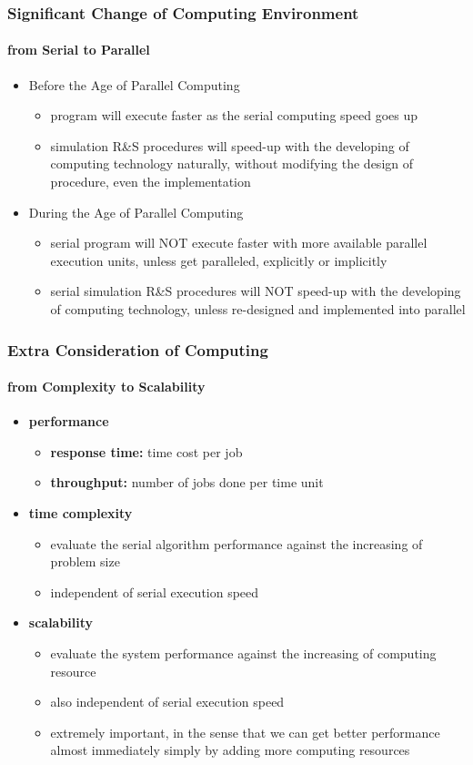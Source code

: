 \documentclass{beamer}
\begin{document}
\begin{frame}
\frametitle {Significant Change of Computing Environment}
\framesubtitle{from Serial to Parallel}
\begin{itemize}
\item Before the Age of Parallel Computing
\begin{itemize}
\item program will execute faster as the serial computing speed goes up
\item simulation R\&S procedures will speed-up with the developing of computing technology naturally, without modifying the design of procedure, even the implementation
\end{itemize}
\vspace{\baselineskip}
\item During the Age of Parallel Computing
\begin{itemize}
\item serial program will {\color{blue} NOT} execute faster with more available parallel execution units, unless get paralleled, explicitly or implicitly
\item serial simulation R\&S procedures will {\color{blue} NOT} speed-up with the developing of computing technology, unless re-designed and implemented into parallel
\end{itemize}
\end{itemize}
\end{frame}

\begin{frame}
\frametitle{Extra Consideration of Computing}
\framesubtitle{from Complexity to Scalability}
\begin{itemize}
\item {\bf performance}
\begin{itemize}
\item {\bf response time:} time cost per job
\item {\bf throughput:} number of jobs done per time unit
\end{itemize}
\item {\bf time complexity}
\begin{itemize}
\item evaluate the serial algorithm performance against the increasing of problem size
\item independent of serial execution speed
\end{itemize}
\item {\bf scalability}
\begin{itemize}
\item evaluate the system performance against the increasing of computing resource
\item also independent of serial execution speed
\item extremely important, in the sense that we can get better performance almost immediately simply by adding more computing resources
\end{itemize}
\end{itemize}
\end{frame}
\end{document}
